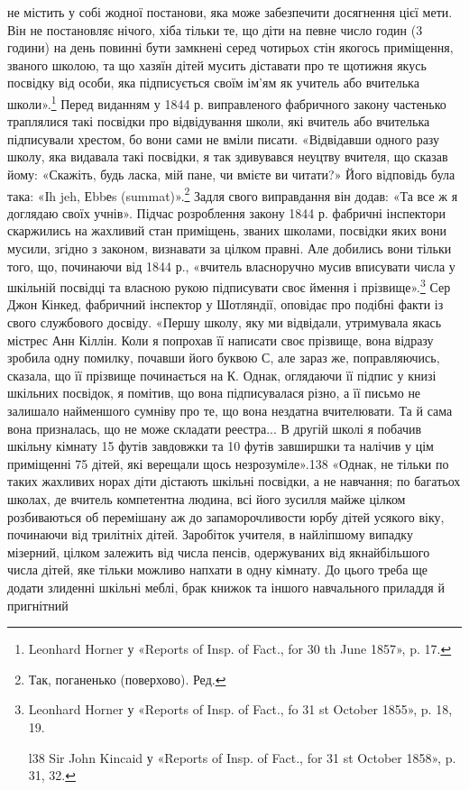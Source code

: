 \parcont{}  %
не містить у собі жодної постанови, яка може забезпечити досягнення
цієї мети. Він не постановляє нічого, хіба тільки те, що
діти на певне число годин (3 години) на день повинні бути замкнені
серед чотирьох стін якогось приміщення, званого школою, та
що хазяїн дітей мусить діставати про те щотижня якусь посвідку
від особи, яка підписується своїм ім’ям як учитель або вчителька
школи».\footnote{
Leonhard Horner у «Reports of Insp. of Fact., for 30 th June 1857»,
p. 17.
} Перед виданням у 1844 р. виправленого фабричного
закону частенько траплялися такі посвідки про відвідування
школи, які вчитель або вчителька підписували хрестом, бо вони
сами не вміли писати. «Відвідавши одного разу школу, яка видавала
такі посвідки, я так здивувався неуцтву вчителя, що сказав
йому: «Скажіть, будь ласка, мій пане, чи вмієте ви читати?»
Його відповідь була така: «Іh jeh, Еbbеs (summat)».\footnote*{
Так, поганенько (поверхово). Ред.
} Задля свого
виправдання він додав: «Та все ж я доглядаю своїх учнів». Підчас
розроблення закону 1844 р. фабричні інспектори скаржились
на жахливий стан приміщень, званих школами, посвідки яких
вони мусили, згідно з законом, визнавати за цілком правні. Але
добились вони тільки того, що, починаючи від 1844 р., «вчитель
власноручно мусив вписувати числа у шкільній посвідці та власною
рукою підписувати своє ймення і прізвище».\footnote{
Leonhard Horner у «Reports of Insp. of Fact., fo 31 st October
1855», p. 18, 19.

l38 Sir John Kincaid у «Reports of Insp. of Fact., for 31 st October
1858», p. 31, 32.
} Сер Джон
Кінкед, фабричний інспектор у Шотляндії, оповідає про подібні
факти із свого службового досвіду. «Першу школу, яку ми відвідали,
утримувала якась містрес Анн Кіллін. Коли я попрохав її
написати своє прізвище, вона відразу зробила одну помилку,
почавши його буквою С, але зараз же, поправляючись, сказала,
що її прізвище починається на К. Однак, оглядаючи її підпис у
книзі шкільних посвідок, я помітив, що вона підписувалася різно,
а її письмо не залишало найменшого сумніву про те, що вона
нездатна вчителювати. Та й сама вона призналась, що не може
складати реестра... В другій школі я побачив шкільну кімнату
15 футів завдовжки та 10 футів завширшки та налічив у цім приміщенні
75 дітей, які верещали щось незрозуміле».138 «Однак,
не тільки по таких жахливих норах діти дістають шкільні посвідки,
а не навчання; по багатьох школах, де вчитель компетентна
людина, всі його зусилля майже цілком розбиваються об
перемішану аж до запаморочливости юрбу дітей усякого віку,
починаючи від трилітніх дітей. Заробіток учителя, в найліпшому
випадку мізерний, цілком залежить від числа пенсів, одержуваних
від якнайбільшого числа дітей, яке тільки можливо напхати в
одну кімнату. До цього треба ще додати злиденні шкільні меблі,
брак книжок та іншого навчального приладдя й пригнітний
\parbreak{}  %
